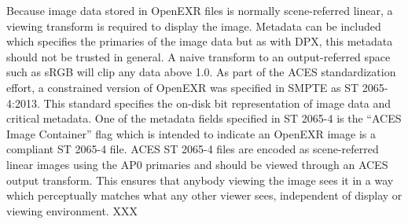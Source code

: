 Because image data stored in OpenEXR files is normally scene-referred linear, a viewing transform is required to display the image. Metadata can be included which specifies the primaries of the image data but as with DPX, this metadata should not be trusted in general. A naive transform to an output-referred space such as sRGB will clip any data above 1.0. As part of the ACES standardization effort, a constrained version of OpenEXR was specified in SMPTE as ST 2065-4:2013.  This standard specifies the on-disk bit representation of image data and critical metadata.  One of the metadata fields specified in ST 2065-4 is the “ACES Image Container” flag which is intended to indicate an OpenEXR image is a compliant ST 2065-4 file.  ACES ST 2065-4 files are encoded as scene-referred linear images using the AP0 primaries and should be viewed through an ACES output transform. This ensures that anybody viewing the image sees it in a way which perceptually matches what any other viewer sees, independent of display or viewing environment.
XXX

